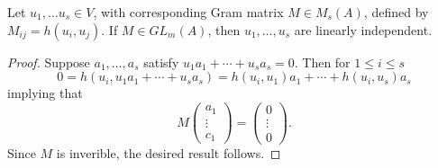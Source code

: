 \begin{lemma}\label{lemma2.4}
Let $u_1, \dotsc u_s \in V$, with corresponding Gram matrix $M \in M_s(A)$, defined by $M_{ij} = h(u_i, u_j)$.
If $M \in GL_m(A)$, then $u_1, \dotsc, u_s$ are linearly independent.
\end{lemma}
\begin{proof}
Suppose $a_1, \dotsc, a_s$ satisfy $u_1 a_1 + \dotsb + u_sa_s = 0$.
Then for $1 \le i \le s$
\[
0 = h(u_i, u_1 a_1 + \dotsb + u_s a_s) = h(u_i, u_1)a_1 + \dotsb + h(u_i, u_s)a_s
\]
implying that 
\[
M \left( \begin{array}{c}
a_1 \\
\vdots \\
c_1
\end{array} \right)
= \left( \begin{array}{c}
0 \\
\vdots \\
0
\end{array}
\right).
\]
Since $M$ is inverible, the desired result follows.
\end{proof}
